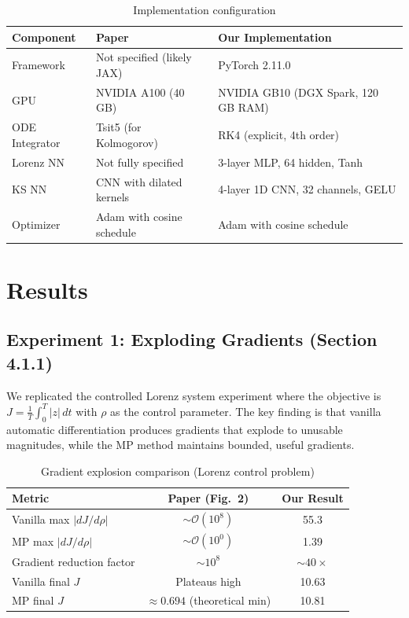 \documentclass[11pt]{article}
\newcommand{\ourval}[1]{\textcolor{oursred}{#1}}
\begin{document}
\begin{table}[H]
\centering
\caption{Implementation configuration}
\label{tab:config}
\small
\begin{tabular}{@{}lll@{}}
\toprule
\textbf{Component} & \textbf{Paper} & \textbf{Our Implementation} \\
\midrule
Framework & Not specified (likely JAX) & PyTorch 2.11.0 \\
GPU & NVIDIA A100 (40 GB) & NVIDIA GB10 (DGX Spark, 120 GB RAM) \\
ODE Integrator & Tsit5 (for Kolmogorov) & RK4 (explicit, 4th order) \\
Lorenz NN & Not fully specified & 3-layer MLP, 64 hidden, Tanh \\
KS NN & CNN with dilated kernels & 4-layer 1D CNN, 32 channels, GELU \\
Optimizer & Adam with cosine schedule & Adam with cosine schedule \\
\bottomrule
\end{tabular}
\end{table}

\section{Results}

\subsection{Experiment 1: Exploding Gradients (Section 4.1.1)}

We replicated the controlled Lorenz system experiment where the objective is $J = \frac{1}{T}\int_0^T |z|\,dt$ with $\rho$ as the control parameter. The key finding is that vanilla automatic differentiation produces gradients that explode to unusable magnitudes, while the MP method maintains bounded, useful gradients.

\begin{table}[H]
\centering
\caption{Gradient explosion comparison (Lorenz control problem)}
\label{tab:gradients}
\begin{tabular}{@{}lcc@{}}
\toprule
\textbf{Metric} & \textbf{Paper (Fig.\ 2)} & \textbf{Our Result} \\
\midrule
Vanilla max $|dJ/d\rho|$ & $\sim\mathcal{O}(10^8)$ & \ourval{55.3} \\
MP max $|dJ/d\rho|$ & $\sim\mathcal{O}(10^0)$ & \ourval{1.39} \\
Gradient reduction factor & $\sim 10^8$ & \ourval{$\sim 40\times$} \\
Vanilla final $J$ & Plateaus high & \ourval{10.63} \\
MP final $J$ & $\approx 0.694$ (theoretical min) & \ourval{10.81} \\
\bottomrule
\end{tabular}
\end{table}
\end{document}
